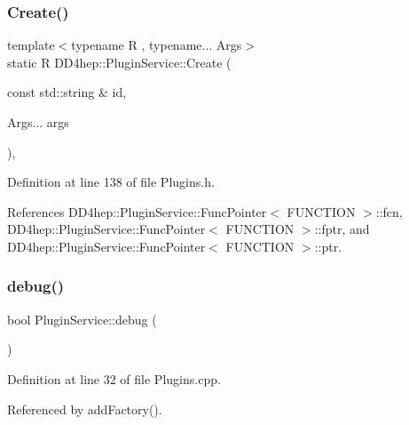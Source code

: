 \subsubsection{\texorpdfstring{Create()}{Create()}}
{\footnotesize\ttfamily template$<$typename R , typename... Args$>$ \\
static R D\+D4hep\+::\+Plugin\+Service\+::\+Create (\begin{DoxyParamCaption}\item[{const std\+::string \&}]{id,  }\item[{Args...}]{args }\end{DoxyParamCaption})\hspace{0.3cm}{\ttfamily [inline]}, {\ttfamily [static]}}



Definition at line 138 of file Plugins.\+h.



References D\+D4hep\+::\+Plugin\+Service\+::\+Func\+Pointer$<$ F\+U\+N\+C\+T\+I\+O\+N $>$\+::fcn, D\+D4hep\+::\+Plugin\+Service\+::\+Func\+Pointer$<$ F\+U\+N\+C\+T\+I\+O\+N $>$\+::fptr, and D\+D4hep\+::\+Plugin\+Service\+::\+Func\+Pointer$<$ F\+U\+N\+C\+T\+I\+O\+N $>$\+::ptr.

\hypertarget{class_d_d4hep_1_1_plugin_service_a90761f21b553c0285eff00839dd912e8}{}\label{class_d_d4hep_1_1_plugin_service_a90761f21b553c0285eff00839dd912e8} 
\subsubsection{\texorpdfstring{debug()}{debug()}}
{\footnotesize\ttfamily bool Plugin\+Service\+::debug (\begin{DoxyParamCaption}{ }\end{DoxyParamCaption})\hspace{0.3cm}{\ttfamily [static]}}



Definition at line 32 of file Plugins.\+cpp.



Referenced by add\+Factory().

\hypertarget{class_d_d4hep_1_1_plugin_service_a2dab56b633f8a12cdf1e57295f7c01f6}{}\label{class_d_d4hep_1_1_plugin_service_a2dab56b633f8a12cdf1e57295f7c01f6} 
